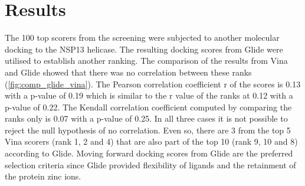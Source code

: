 \documentclass[11pt, letterpaper, titlepage]{article}
\begin{document}
\section{Results}
The 100 top scorers from the screening were subjected to another molecular docking to the NSP13 helicase. The resulting docking scores from Glide were utilised to establish another ranking. The comparison of the results from Vina and Glide showed that there was no correlation between these ranks (\autoref{fig:comp_glide_vina}). The Pearson correlation coefficient r of the scores is 0.13 with a p-value of 0.19 which is similar to the r value of the ranks at 0.12 with a p-value of 0.22. The Kendall correlation coefficient computed by comparing the ranks only is 0.07 with a p-value of 0.25. In all three cases it is not possible to reject the null hypothesis of no correlation. Even so, there are 3 from the top 5 Vina scorers (rank 1, 2 and 4) that are also part of the top 10 (rank 9, 10 and 8) according to Glide. Moving forward docking scores from Glide are the preferred selection criteria since Glide provided flexibility of ligands and the retainment of the protein zinc ions. \\
\end{document}
